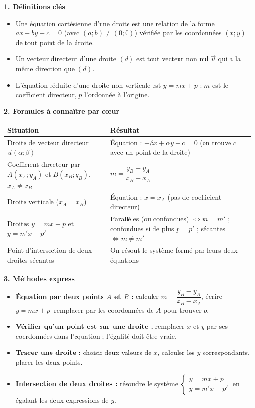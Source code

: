 \documentclass[11pt]{article}
\newcommand{\cle}[1]{{\popxbold\color{popdark}#1}}
\begin{document}
\begin{bilan}
\textbf{1. Définitions clés}
\begin{itemize}
  \item Une \cle{équation cartésienne} d'une droite est une relation de la forme $ax+by+c=0$ (avec $(a;b)\neq(0;0)$) vérifiée par les coordonnées $(x;y)$ de tout point de la droite.
  \item Un \cle{vecteur directeur} d'une droite $(d)$ est tout vecteur non nul $\vec{u}$ qui a la même direction que $(d)$.
  \item L'\cle{équation réduite} d'une droite non verticale est $y=mx+p$ : $m$ est le \cle{coefficient directeur}, $p$ l'\cle{ordonnée à l'origine}.
\end{itemize}

\textbf{2. Formules à connaître par cœur}
\begin{center}
\begin{tabularx}{\linewidth}{|l|X|}
\hline
\rowcolor{popblueL} \textbf{Situation} & \textbf{Résultat} \\
\hline
Droite de vecteur directeur $\vec{u}(\alpha;\beta)$ & Équation : $-\beta x+\alpha y+c=0$ (on trouve $c$ avec un point de la droite) \\
\hline
Coefficient directeur par $A(x_A;y_A)$ et $B(x_B;y_B)$, $x_A\neq x_B$ & $m=\dfrac{y_B-y_A}{x_B-x_A}$ \\
\hline
Droite verticale ($x_A=x_B$) & Équation : $x=x_A$ (pas de coefficient directeur) \\
\hline
Droites $y=mx+p$ et $y=m'x+p'$ & Parallèles (ou confondues) $\Leftrightarrow m=m'$ ; confondues si de plus $p=p'$ ; sécantes $\Leftrightarrow m\neq m'$ \\
\hline
Point d'intersection de deux droites sécantes & On résout le système formé par leurs deux équations \\
\hline
\end{tabularx}
\end{center}

\textbf{3. Méthodes express}
\begin{itemize}
  \item \textbf{Équation par deux points $A$ et $B$ :} calculer $m=\dfrac{y_B-y_A}{x_B-x_A}$, écrire $y=mx+p$, remplacer par les coordonnées de $A$ pour trouver $p$.
  \item \textbf{Vérifier qu'un point est sur une droite :} remplacer $x$ et $y$ par ses coordonnées dans l'équation ; l'égalité doit être vraie.
  \item \textbf{Tracer une droite :} choisir deux valeurs de $x$, calculer les $y$ correspondants, placer les deux points.
  \item \textbf{Intersection de deux droites :} résoudre le système $\begin{cases} y=mx+p \\ y=m'x+p' \end{cases}$ en égalant les deux expressions de $y$.
\end{itemize}
\end{bilan}
\end{document}
